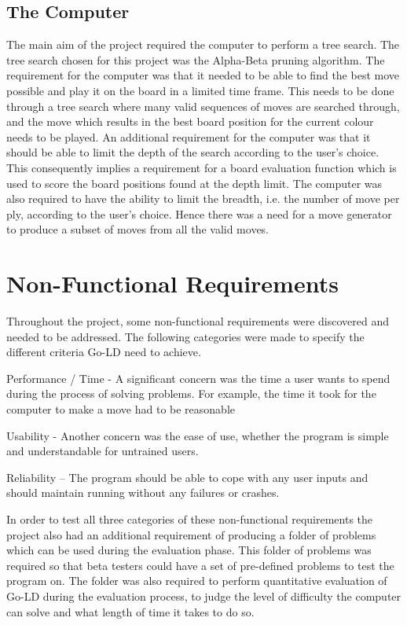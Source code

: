 \documentclass{l4proj}
\begin{document}
\subsection{The Computer}
The main aim of the project required the computer to perform a tree search. The tree search chosen for this project was the Alpha-Beta pruning algorithm. The requirement for the computer was that it needed to be able to find the best move possible and play it on the board in a limited time frame. This needs to be done through a tree search where many valid sequences of moves are searched through, and the move which results in the best board position for the current colour needs to be played. An additional requirement for the computer was that it should be able to limit the depth of the search according to the user’s choice. This consequently implies a requirement for a board evaluation function which is used to score the board positions found at the depth limit. The computer was also required to have the ability to limit the breadth, i.e. the number of move per ply, according to the user’s choice. Hence there was a need for a move generator to produce a subset of moves from all the valid moves.


\section{Non-Functional Requirements}
Throughout the project, some non-functional requirements were discovered and needed to be addressed. The following categories were made to specify the different criteria Go-LD need to achieve.

Performance / Time - A significant concern was the time a user wants to spend during the process of solving problems. For example, the time it took for the computer to make a move had to be reasonable

Usability - Another concern was the ease of use, whether the program is simple and understandable for untrained users.

Reliability – The program should be able to cope with any user inputs and should maintain running without any failures or crashes.

In order to test all three categories of these non-functional requirements the project also had an additional requirement of producing a folder of problems which can be used during the evaluation phase. This folder of problems was required so that beta testers could have a set of pre-defined problems to test the program on. The folder was also required to perform quantitative evaluation of Go-LD during the evaluation process, to judge the level of difficulty the computer can solve and what length of time it takes to do so.
\end{document}
